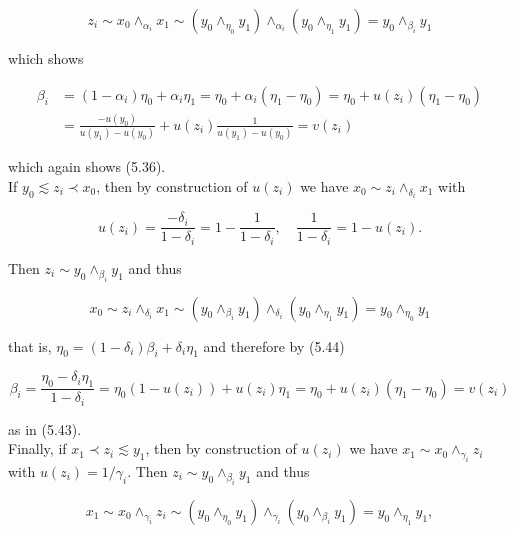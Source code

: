 \documentclass[12pt]{article}
\begin{document}
$$
z_{i} \sim x_{0} \wedge_{\alpha_{i}} x_{1} \sim\left(y_{0} \wedge_{\eta_{0}} y_{1}\right) \wedge_{\alpha_{i}}\left(y_{0} \wedge_{\eta_{1}} y_{1}\right)=y_{0} \wedge_{\beta_{i}} y_{1}
$$

which shows


\begin{align*}
\beta_{i} & =\left(1-\alpha_{i}\right) \eta_{0}+\alpha_{i} \eta_{1}=\eta_{0}+\alpha_{i}\left(\eta_{1}-\eta_{0}\right)=\eta_{0}+u\left(z_{i}\right)\left(\eta_{1}-\eta_{0}\right) \\
& =\frac{-u\left(y_{0}\right)}{u\left(y_{1}\right)-u\left(y_{0}\right)}+u\left(z_{i}\right) \frac{1}{u\left(y_{1}\right)-u\left(y_{0}\right)}=v\left(z_{i}\right) \tag{5.43}
\end{align*}


which again shows (5.36).\\
If $y_{0} \lesssim z_{i} \prec x_{0}$, then by construction of $u\left(z_{i}\right)$ we have $x_{0} \sim z_{i} \wedge_{\delta_{i}} x_{1}$ with


\begin{equation*}
u\left(z_{i}\right)=\frac{-\delta_{i}}{1-\delta_{i}}=1-\frac{1}{1-\delta_{i}}, \quad \frac{1}{1-\delta_{i}}=1-u\left(z_{i}\right) . \tag{5.44}
\end{equation*}


Then $z_{i} \sim y_{0} \wedge_{\beta_{i}} y_{1}$ and thus

$$
x_{0} \sim z_{i} \wedge_{\delta_{i}} x_{1} \sim\left(y_{0} \wedge_{\beta_{i}} y_{1}\right) \wedge_{\delta_{i}}\left(y_{0} \wedge_{\eta_{1}} y_{1}\right)=y_{0} \wedge_{\eta_{0}} y_{1}
$$

that is, $\eta_{0}=\left(1-\delta_{i}\right) \beta_{i}+\delta_{i} \eta_{1}$ and therefore by (5.44)

$$
\beta_{i}=\frac{\eta_{0}-\delta_{i} \eta_{1}}{1-\delta_{i}}=\eta_{0}\left(1-u\left(z_{i}\right)\right)+u\left(z_{i}\right) \eta_{1}=\eta_{0}+u\left(z_{i}\right)\left(\eta_{1}-\eta_{0}\right)=v\left(z_{i}\right)
$$

as in (5.43).\\
Finally, if $x_{1} \prec z_{i} \lesssim y_{1}$, then by construction of $u\left(z_{i}\right)$ we have $x_{1} \sim x_{0} \wedge_{\gamma_{i}} z_{i}$ with $u\left(z_{i}\right)=1 / \gamma_{i}$. Then $z_{i} \sim y_{0} \wedge_{\beta_{i}} y_{1}$ and thus

$$
x_{1} \sim x_{0} \wedge_{\gamma_{i}} z_{i} \sim\left(y_{0} \wedge_{\eta_{0}} y_{1}\right) \wedge_{\gamma_{i}}\left(y_{0} \wedge_{\beta_{i}} y_{1}\right)=y_{0} \wedge_{\eta_{1}} y_{1},
$$
\end{document}
